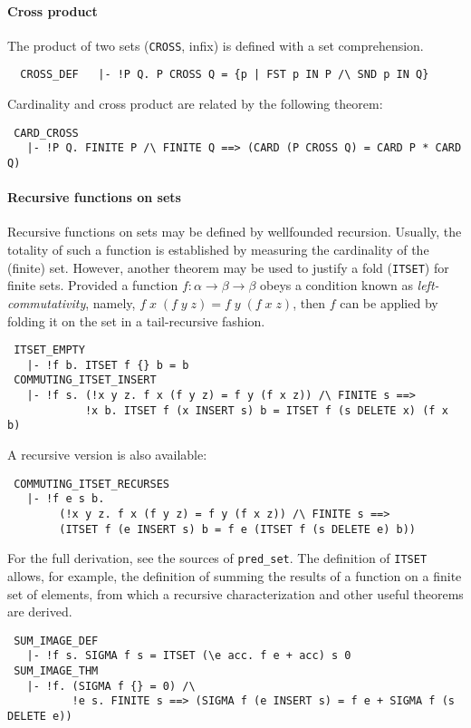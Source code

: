 \paragraph{Cross product}
The product of two sets ({\small\verb+CROSS+}, infix) is defined
with a set comprehension.
%
{\small
\begin{verbatim}
  CROSS_DEF   |- !P Q. P CROSS Q = {p | FST p IN P /\ SND p IN Q}
\end{verbatim}
}
%
\noindent Cardinality and cross product are related by the following theorem:
{\small
\begin{verbatim}
 CARD_CROSS
   |- !P Q. FINITE P /\ FINITE Q ==> (CARD (P CROSS Q) = CARD P * CARD Q)
\end{verbatim}
}
%
\paragraph{Recursive functions on sets}

Recursive functions on sets may be defined by wellfounded
recursion. Usually, the totality of such a function is established by
measuring the cardinality of the (finite) set. However, another
theorem may be used to justify a fold ({\small\verb+ITSET+}) for finite sets.
Provided a function $f:\alpha\to\beta\to\beta$ obeys a condition
known as \emph{left-commutativity}, namely, $f\;x\;(f\;y\;z) =
f\;y\;(f\;x\;z)$, then $f$ can be applied by folding it on the set
in a tail-recursive fashion.
%
{\small
\begin{verbatim}
 ITSET_EMPTY
   |- !f b. ITSET f {} b = b
 COMMUTING_ITSET_INSERT
   |- !f s. (!x y z. f x (f y z) = f y (f x z)) /\ FINITE s ==>
            !x b. ITSET f (x INSERT s) b = ITSET f (s DELETE x) (f x b)
\end{verbatim}
}
%
\noindent A recursive version is also available:
{\small
\begin{verbatim}
 COMMUTING_ITSET_RECURSES
   |- !f e s b.
        (!x y z. f x (f y z) = f y (f x z)) /\ FINITE s ==>
        (ITSET f (e INSERT s) b = f e (ITSET f (s DELETE e) b))
\end{verbatim}
}
%
For the full derivation, see the sources of {\small\verb+pred_set+}.
The definition of {\small\verb+ITSET+} allows, for example, the
definition of summing the results of a function on a finite set of elements,
from which a recursive characterization and other useful theorems are derived.
%
{\small
\begin{verbatim}
 SUM_IMAGE_DEF
   |- !f s. SIGMA f s = ITSET (\e acc. f e + acc) s 0
 SUM_IMAGE_THM
   |- !f. (SIGMA f {} = 0) /\
          !e s. FINITE s ==> (SIGMA f (e INSERT s) = f e + SIGMA f (s DELETE e))
\end{verbatim}
}

